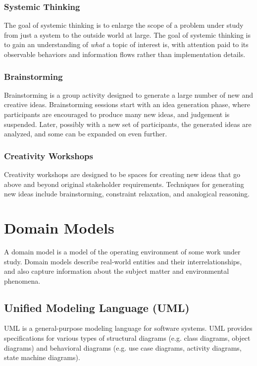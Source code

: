 \documentclass[12pt,titlepage]{article}
\let\stdsection\section
\renewcommand\section{\clearpage\stdsection}
\begin{document}
      \subsubsection{Systemic Thinking}
        The goal of systemic thinking is to enlarge the scope of a problem under study from just a system to the outside world at large. The goal of systemic thinking is to
        gain an understanding of \textit{what} a topic of interest is, with attention paid to its observable behaviors and information flows rather than implementation
        details.

      \subsubsection{Brainstorming}
        Brainstorming is a group activity designed to generate a large number of new and creative ideas. Brainstorming sessions start with an idea generation phase, where
        participants are encouraged to produce many new ideas, and judgement is suspended. Later, possibly with a new set of participants, the generated ideas are analyzed,
        and some can be expanded on even further.

      \subsubsection{Creativity Workshops}
        Creativity workshops are designed to be spaces for creating new ideas that go above and beyond original stakeholder requirements. Techniques for generating new ideas
        include brainstorming, constraint relaxation, and analogical reasoning.

  \section{Domain Models}
    A domain model is a model of the operating environment of some work under study. Domain models describe real-world entities and their interrelationships, and also capture
    information about the subject matter and environmental phenomena.

    \subsection{Unified Modeling Language (UML)}
      UML is a general-purpose modeling language for software systems. UML provides specifications for various types of structural diagrams (e.g. class diagrams, object diagrams)
      and behavioral diagrams (e.g. use case diagrams, activity diagrams, state machine diagrams).
      
\end{document}
